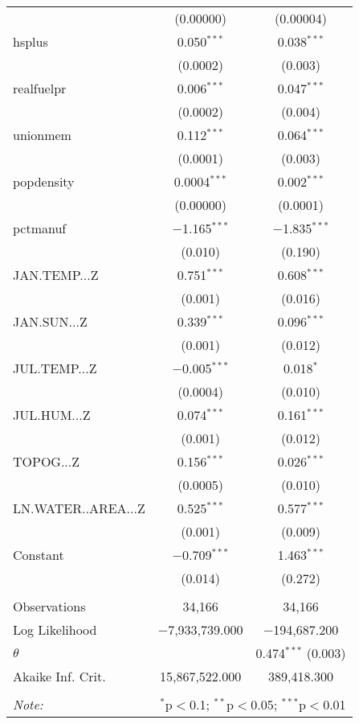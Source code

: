 \begin{table}[!htbp]
\begin{tabular}{@{\extracolsep{5pt}}lcc}
  & (0.00000) & (0.00004) \\ 
  hsplus & 0.050$^{***}$ & 0.038$^{***}$ \\ 
  & (0.0002) & (0.003) \\ 
  realfuelpr & 0.006$^{***}$ & 0.047$^{***}$ \\ 
  & (0.0002) & (0.004) \\ 
  unionmem & 0.112$^{***}$ & 0.064$^{***}$ \\ 
  & (0.0001) & (0.003) \\ 
  popdensity & 0.0004$^{***}$ & 0.002$^{***}$ \\ 
  & (0.00000) & (0.0001) \\ 
  pctmanuf & $-$1.165$^{***}$ & $-$1.835$^{***}$ \\ 
  & (0.010) & (0.190) \\ 
  JAN.TEMP...Z & 0.751$^{***}$ & 0.608$^{***}$ \\ 
  & (0.001) & (0.016) \\ 
  JAN.SUN...Z & 0.339$^{***}$ & 0.096$^{***}$ \\ 
  & (0.001) & (0.012) \\ 
  JUL.TEMP...Z & $-$0.005$^{***}$ & 0.018$^{*}$ \\ 
  & (0.0004) & (0.010) \\ 
  JUL.HUM...Z & 0.074$^{***}$ & 0.161$^{***}$ \\ 
  & (0.001) & (0.012) \\ 
  TOPOG...Z & 0.156$^{***}$ & 0.026$^{***}$ \\ 
  & (0.0005) & (0.010) \\ 
  LN.WATER..AREA...Z & 0.525$^{***}$ & 0.577$^{***}$ \\ 
  & (0.001) & (0.009) \\ 
  Constant & $-$0.709$^{***}$ & 1.463$^{***}$ \\ 
  & (0.014) & (0.272) \\ 
 \hline \\[-1.8ex] 
Observations & 34,166 & 34,166 \\ 
Log Likelihood & $-$7,933,739.000 & $-$194,687.200 \\ 
$\theta$ &  & 0.474$^{***}$  (0.003) \\ 
Akaike Inf. Crit. & 15,867,522.000 & 389,418.300 \\ 
\hline 
\hline \\[-1.8ex] 
\textit{Note:}  & \multicolumn{2}{r}{$^{*}$p$<$0.1; $^{**}$p$<$0.05; $^{***}$p$<$0.01} \\ 
\end{tabular} 
\end{table} 
